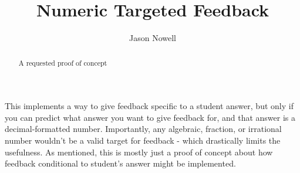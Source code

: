 \documentclass{ximera}
\title{Numeric Targeted Feedback}
\author{Jason Nowell}
\def\HCode{}
\begin{document}
\setcounter{feedbackOutput}{0}

\newcommand{\feedbackOutput}[1]{
    \HCode{<p id="#1">}
    \HCode{</p>}
    }
\begin{abstract}
    A requested proof of concept
\end{abstract}
\maketitle

This implements a way to give feedback specific to a student answer, but only if you can predict what answer you want to give feedback for, and that answer is a decimal-formatted number. Importantly, any algebraic, fraction, or irrational number wouldn't be a valid target for feedback - which drastically limits the usefulness. As mentioned, this is mostly just a proof of concept about how feedback conditional to student's answer might be implemented.
\end{document}
